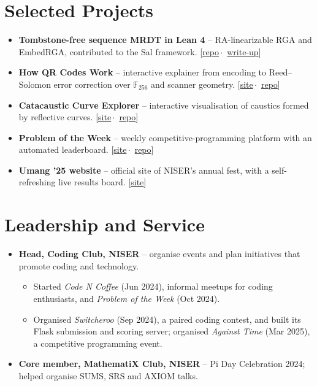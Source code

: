 \documentclass[11pt,a4paper]{article}
\newcommand{\links}[1]{{\small[#1]}}
\begin{document}
\section{Selected Projects}
\begin{itemize}[leftmargin=1.1em]
  \item \textbf{Tombstone-free sequence MRDT in Lean 4} -- RA-linearizable RGA and EmbedRGA, contributed to
        the Sal framework. \links{\href{https://github.com/fplaunchpad/sal}{repo}\,$\cdot$\,%
        \href{https://methaphur.github.io/blogs/replicated-growable-array/}{write-up}}
  \item \textbf{How QR Codes Work} -- interactive explainer from encoding to Reed--Solomon error
        correction over $\mathbb{F}_{256}$ and scanner geometry.
        \links{\href{https://methaphur.github.io/How-do-QR-Codes-Work/}{site}\,$\cdot$\,%
        \href{https://github.com/Methaphur/How-do-QR-Codes-Work}{repo}}
  \item \textbf{Catacaustic Curve Explorer} -- interactive visualisation of caustics formed by reflective curves.
        \links{\href{https://methaphur.github.io/catacaustic-curves/}{site}\,$\cdot$\,%
        \href{https://github.com/Methaphur/catacaustic-curves}{repo}}
  \item \textbf{Problem of the Week} -- weekly competitive-programming platform with an automated leaderboard.
        \links{\href{https://sdgniser.github.io/problem-of-the-week}{site}\,$\cdot$\,%
        \href{https://github.com/Methaphur/problem-of-the-week}{repo}}
  \item \textbf{Umang '25 website} -- official site of NISER's annual fest, with a self-refreshing live results board.
        \links{\href{https://methaphur.github.io/Umang/}{site}}
\end{itemize}

\section{Leadership and Service}
\begin{itemize}[leftmargin=1.1em]
  \item \textbf{Head, Coding Club, NISER} -- organise events and plan initiatives that promote coding and technology.
        \begin{itemize}
          \item Started \emph{Code N Coffee} (Jun 2024), informal meetups for coding enthusiasts, and
                \emph{Problem of the Week} (Oct 2024).
          \item Organised \emph{Switcheroo} (Sep 2024), a paired coding contest, and built its Flask
                submission and scoring server; organised \emph{Against Time} (Mar 2025), a
                competitive programming event.
        \end{itemize}
  \item \textbf{Core member, MathematiX Club, NISER} -- Pi Day Celebration 2024; helped organise SUMS,
        SRS and AXIOM talks.
\end{itemize}
\end{document}
